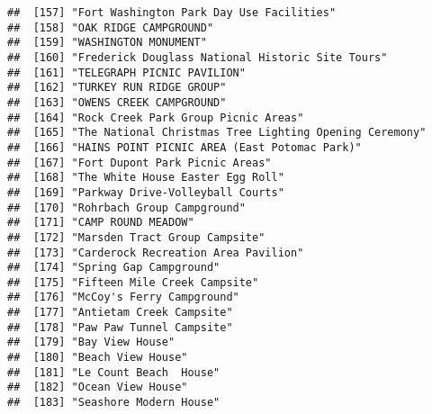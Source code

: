 \documentclass[
]{article}
\begin{document}
\begin{verbatim}
##  [157] "Fort Washington Park Day Use Facilities"                                             
##  [158] "OAK RIDGE CAMPGROUND"                                                                
##  [159] "WASHINGTON MONUMENT"                                                                 
##  [160] "Frederick Douglass National Historic Site Tours"                                     
##  [161] "TELEGRAPH PICNIC PAVILION"                                                           
##  [162] "TURKEY RUN RIDGE GROUP"                                                              
##  [163] "OWENS CREEK CAMPGROUND"                                                              
##  [164] "Rock Creek Park Group Picnic Areas"                                                  
##  [165] "The National Christmas Tree Lighting Opening Ceremony"                               
##  [166] "HAINS POINT PICNIC AREA (East Potomac Park)"                                         
##  [167] "Fort Dupont Park Picnic Areas"                                                       
##  [168] "The White House Easter Egg Roll"                                                     
##  [169] "Parkway Drive-Volleyball Courts"                                                     
##  [170] "Rohrbach Group Campground"                                                           
##  [171] "CAMP ROUND MEADOW"                                                                   
##  [172] "Marsden Tract Group Campsite"                                                        
##  [173] "Carderock Recreation Area Pavilion"                                                  
##  [174] "Spring Gap Campground"                                                               
##  [175] "Fifteen Mile Creek Campsite"                                                         
##  [176] "McCoy's Ferry Campground"                                                            
##  [177] "Antietam Creek Campsite"                                                             
##  [178] "Paw Paw Tunnel Campsite"                                                             
##  [179] "Bay View House"                                                                      
##  [180] "Beach View House"                                                                    
##  [181] "Le Count Beach  House"                                                               
##  [182] "Ocean View House"                                                                    
##  [183] "Seashore Modern House"                                                               

\end{verbatim}
\end{document}
